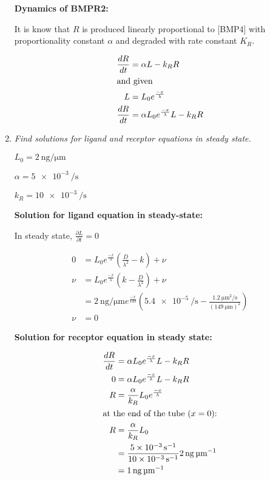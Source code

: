 \documentclass{article} %
\begin{document}
\begin{enumerate}
    \textbf{Dynamics of BMPR2:}

    It is know that $R$ is produced linearly proportional to [BMP4] with proportionality constant $\alpha$ and degraded with rate constant $K_R$.

    \begin{align*}
    \frac{dR}{dt} &= \alpha L-k_R R \\
      \intertext{and given}
      L &= L_0 e^{\frac{-x}{\lambda}} \\
    \frac{dR}{dt} &= \alpha L_0 e^{\frac{-x}{\lambda}} L-k_R R \\
    \end{align*}

  \item \textit{Find solutions for ligand and receptor equations in steady state.}

      $L_0=\SI{2}{\nano\g\per\micro\m}$

      $\alpha = \SI{5e-3}{\per\s}$

      $k_R= \SI{10e-3}{\per\s}$


      \textbf{Solution for ligand equation in steady-state:}

      In steady state, $\frac{\partial L}{\partial t} = 0$  

      \begin{align*}
        0 &= L_0e^{\frac{-x}{\lambda}}\left(\frac{D}{\lambda^2} -k \right) + \nu \\
        \nu &= L_0e^{\frac{-x}{\lambda}}\left(k - \frac{D}{\lambda^2} \right) + \nu \\
          &= \SI{2}{\nano\g\per\micro\m}e^{\frac{-x}{149}} \left (\SI{5.4e-5}{\per\s} - \frac{\SI{1.2}{\micro\m^2\per\s}}{(\SI{149}{\micro\m})^2} \right ) \\
          \nu &= 0
      \end{align*}

      \textbf{Solution for receptor equation in steady state:}

      \begin{align*}
        \frac{dR}{dt} &= \alpha L_0 e^{\frac{-x}{\lambda}} L-k_R R \\
        0 &= \alpha L_0 e^{\frac{-x}{\lambda}} L-k_R R \\
        R &= \frac{\alpha}{k_R} L_0e^{\frac{-x}{\lambda}} \\
        \intertext{at the end of the tube ($x=0$):}
        R &= \frac{\alpha}{k_R}L_0 \\
                      &= \frac{\SI{5e-3}{\per\s}}{\SI{10e-3}{\per\s}} \SI{2}{\nano\gram\per\micro\m} \\
        &= \SI{1}{\nano\g\per\micro\m}
      \end{align*}
        

\end{enumerate}
\end{document}
